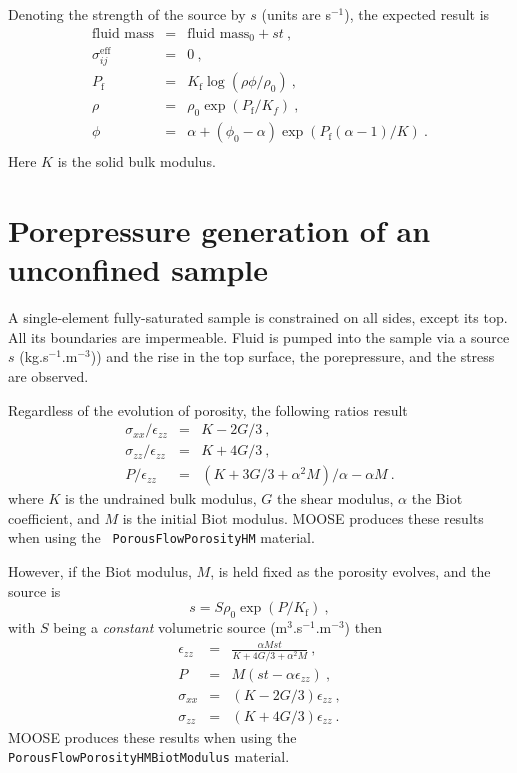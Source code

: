 Denoting the strength of the source by $s$ (units are s$^{-1}$), the expected result is
\begin{eqnarray}
\mbox{fluid mass} & = & \mbox{fluid mass}_{0} + st \ , \nonumber \\
\sigma_{ij}^{\mathrm{eff}} & = & 0 \ , \nonumber \\
P_{\mathrm{f}} & = & K_{\mathrm{f}}\log(\rho\phi/\rho_{0}) \ , \nonumber
\\
\rho & = & \rho_{0}\exp(P_{\mathrm{f}}/K_{f}) \ , \nonumber \\
\phi & = & \alpha + (\phi_{0}-\alpha)\exp\left(
P_{\mathrm{f}}(\alpha - 1)/K\right) \ . \\
\end{eqnarray}
Here $K$ is the solid bulk modulus.

\section{Porepressure generation of an unconfined sample}

A single-element fully-saturated sample is constrained on all sides,
except its top.  All its boundaries are impermeable.  Fluid is pumped
into the sample via a source $s$ (kg.s$^{-1}$.m$^{-3}$)) and the rise
in the top surface, the porepressure, and the stress are observed.

Regardless of the evolution of porosity, the following ratios result
\begin{eqnarray}
\sigma_{xx}/\epsilon_{zz} & = & K - 2G/3 \ , \nonumber \\
\sigma_{zz}/\epsilon_{zz} & = & K + 4G/3 \ , \nonumber \\
P/\epsilon_{zz} & = & (K + 3G/3 + \alpha^{2}M)/\alpha - \alpha M \ .
\end{eqnarray}
where $K$ is the undrained bulk modulus, $G$ the shear modulus,
$\alpha$ the Biot coefficient, and $M$ is the initial Biot modulus.
MOOSE produces these results when using the {\tt
  PorousFlowPorosityHM} material.


However, if the Biot modulus, $M$, is held fixed as the porosity
evolves, and the source is
\begin{equation}
s = S \rho_{0}\exp(P/K_{\mathrm{f}}) \ ,
\end{equation}
with $S$ being a {\em constant} volumetric source
(m$^{3}$.s$^{-1}$.m$^{-3}$) then
\begin{eqnarray}
\epsilon_{zz} & = & \frac{\alpha M s t}{K + 4G/3 + \alpha^{2}M} \ ,
\nonumber \\
P & = & M(st - \alpha\epsilon_{zz}) \ , \nonumber \\
\sigma_{xx} & = & (K - 2G/3)\epsilon_{zz} \ , \nonumber \\
\sigma_{zz} & = & (K + 4G/3)\epsilon_{zz} \ .
\end{eqnarray}
MOOSE produces these results when using the {\tt
  PorousFlowPorosityHMBiotModulus} material.

